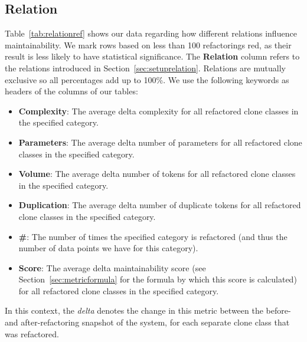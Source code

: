\subsection{Relation}
Table~\ref{tab:relationref} shows our data regarding how different relations influence maintainability. We mark rows based on less than 100 refactorings red, as their result is less likely to have statistical significance. The \textbf{Relation} column refers to the relations introduced in Section~\ref{sec:setuprelation}. Relations are mutually exclusive so all percentages add up to 100\%. We use the following keywords as headers of the columns of our tables:
\begin{itemize}
  \item \textbf{Complexity}: The average delta complexity for all refactored clone classes in the specified category.
  \item \textbf{Parameters}: The average delta number of parameters for all refactored clone classes in the specified category.
  \item \textbf{Volume}: The average delta number of tokens for all refactored clone classes in the specified category.
  \item \textbf{Duplication}: The average delta number of duplicate tokens for all refactored clone classes in the specified category.
  \item \textbf{\#}: The number of times the specified category is refactored (and thus the number of data points we have for this category).
  \item \textbf{Score}: The average delta maintainability score (see Section~\ref{sec:metricformula} for the formula by which this score is calculated) for all refactored clone classes in the specified category.
\end{itemize}
In this context, the \textit{delta} denotes the change in this metric between the before- and after-refactoring snapshot of the system, for each separate clone class that was refactored.

